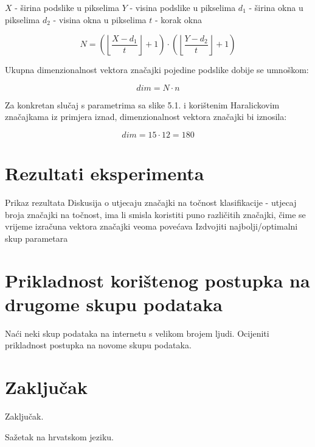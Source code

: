 \documentclass[times, utf8, zavrsni]{fer}
\begin{document}
\begin{center}

\(X\) - širina podslike u pikselima
\(Y\) - visina podslike u pikselima
\(d_1\) - širina okna u pikselima
\(d_2\) - visina okna u pikselima
\(t\) - korak okna

\[
N = \left(\left\lfloor\frac{X-d_1}{t}\right\rfloor + 1\right) \cdot
\left(\left\lfloor\frac{Y-d_2}{t}\right\rfloor + 1\right)
\]

Ukupna dimenzionalnost vektora značajki pojedine podslike dobije se umnoškom:

\[
dim = N \cdot n
\]

Za konkretan slučaj s parametrima sa slike 5.1. i korištenim Haralickovim 
značajkama iz primjera iznad, dimenzionalnost vektora značajki bi iznosila:

\[
dim = 15 \cdot 12 = 180
\]

\end{center}


\chapter{Rezultati eksperimenta}
Prikaz rezultata 
\newline
Diskusija o utjecaju značajki na točnost klasifikacije - utjecaj
broja značajki na točnost, ima li smisla koristiti puno različitih značajki,
čime se vrijeme izračuna vektora značajki veoma povećava
\newline
Izdvojiti najbolji/optimalni skup parametara

\chapter{Prikladnost korištenog postupka na drugome skupu podataka}

Naći neki skup podataka na internetu s velikom brojem ljudi.
\newline
Ocijeniti prikladnost postupka na novome skupu podataka.




\chapter{Zaključak}
Zaključak.




\listoffigures

\begin{sazetak}
Sažetak na hrvatskom jeziku.

\end{sazetak}
\end{document}
